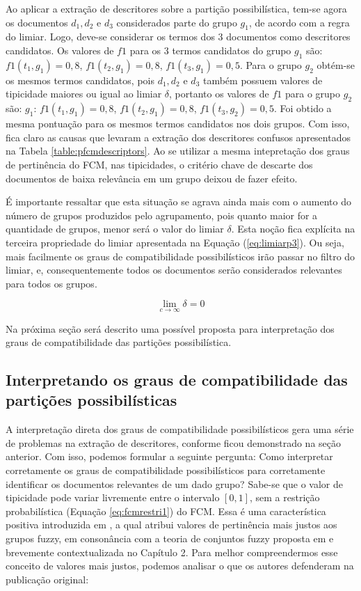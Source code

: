 Ao aplicar a extração de descritores sobre a partição possibilística, tem-se agora
os documentos $d_1, d_2$ e $d_3$ considerados parte do grupo $g_1$, de acordo com a regra do
limiar. Logo, deve-se considerar os termos dos 3 documentos como descritores candidatos. Os valores
de $f1$ para os 3 termos candidatos do grupo $g_1$ são: $f1(t_1,g_1) = 0,8$,
$f1(t_2,g_1) = 0,8$, $f1(t_3,g_1) = 0,5$. Para o grupo $g_2$ obtém-se os mesmos termos
candidatos, pois $d_1, d_2$ e $d_3$ também possuem valores de tipicidade maiores ou igual ao limiar
$\delta$, portanto os valores de $f1$ para o grupo $g_2$ são:  $g_1$: $f1(t_1,g_1) = 0,8$,
$f1(t_2,g_1) = 0,8$, $f1(t_3,g_2) = 0,5$. Foi obtido a mesma pontuação para os mesmos termos
candidatos nos dois grupos. Com isso, fica claro as causas que levaram a extração dos descritores
confusos apresentados na Tabela \ref{table:pfcmdescriptors}.  Ao se utilizar a mesma intepretação
dos graus de pertinência do FCM, nas tipicidades, o critério chave de descarte dos documentos de
baixa relevância em um grupo deixou de fazer efeito.

É importante ressaltar que esta situação se agrava ainda mais com o aumento do número de grupos
produzidos pelo agrupamento, pois quanto maior for a quantidade de grupos, menor será o valor do
limiar $\delta$. Esta noção fica explícita na terceira propriedade do limiar apresentada na Equação
(\ref{eq:limiarp3}). Ou seja, mais facilmente os graus de compatibilidade possibilísticos irão
passar no filtro do limiar, e, consequentemente todos os documentos serão considerados relevantes
para todos os grupos. 

\begin{equation}
  \lim_{c \rightarrow \infty} \delta = 0
  \label{eq:limiarp3}
\end{equation}


Na próxima seção será descrito uma possível proposta para interpretação dos graus de compatibilidade
das partições possibilística.

\subsection{Interpretando os graus de compatibilidade das partições possibilísticas}

A interpretação direta dos graus de compatibilidade possibilísticos gera uma série de problemas na
extração de descritores, conforme ficou demonstrado na seção anterior. Com isso, podemos formular a
seguinte pergunta: Como interpretar corretamente os graus de compatibilidade possibilísticos para
corretamente identificar os documentos relevantes de um dado grupo? Sabe-se que o valor de
tipicidade pode variar livremente entre o intervalo $[0,1]$, sem a restrição probabilística
(Equação \ref{eq:fcmrestri1}) do FCM. Essa é uma
característica positiva introduzida em , a qual atribui valores de
pertinência mais justos aos grupos fuzzy, em consonância com a teoria de conjuntos fuzzy proposta em
 e brevemente contextualizada no Capítulo 2. Para melhor compreendermos esse
conceito de valores mais justos, podemos analisar o que os autores defenderam na publicação
original:

